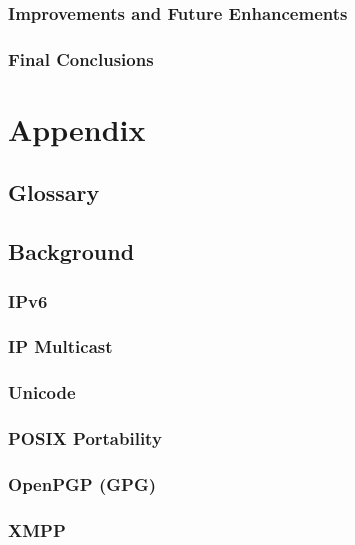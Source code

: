 \documentclass[a4paper,12pt]{report}
\begin{document}
\section{Improvements and Future Enhancements}

\section{Final Conclusions}


\part*{Appendix}

\appendix


\chapter{Glossary}




\chapter{Background}

\section{IPv6}

\section{IP Multicast}

\section{Unicode}

\section{POSIX Portability}

\section{OpenPGP (GPG)}

\section{XMPP}
\end{document}
